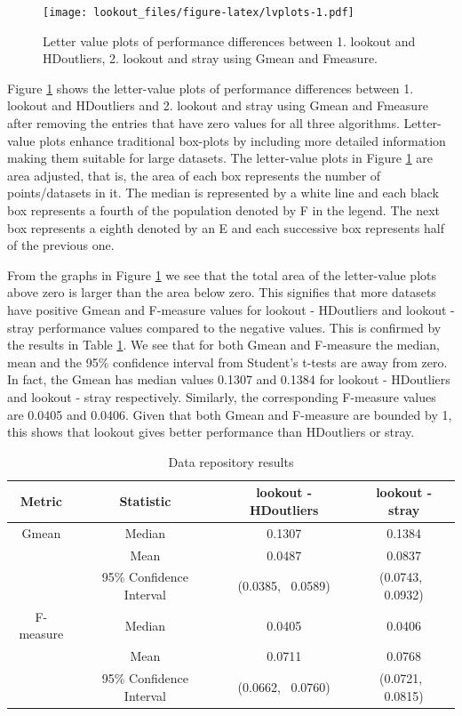 \documentclass[11pt,a4paper,]{article}
\theoremstyle{definition}
\theoremstyle{definition}
\theoremstyle{definition}
\theoremstyle{remark}
\begin{document}
\begin{figure}
\centering
\texttt{[image: lookout\_files/figure-latex/lvplots-1.pdf]}
\caption{\label{fig:lvplots}Letter value plots of performance differences between 1. lookout and HDoutliers, 2. lookout and stray using Gmean and Fmeasure.}
\end{figure}

Figure \ref{fig:lvplots} shows the letter-value plots \autocite{lvplots} of performance differences between
1. lookout and HDoutliers and
2. lookout and stray
using Gmean and Fmeasure after removing the entries that have zero values for all three algorithms. Letter-value plots enhance traditional box-plots by including more detailed information making them suitable for large datasets. The letter-value plots in Figure \ref{fig:lvplots} are area adjusted, that is, the area of each box represents the number of points/datasets in it. The median is represented by a white line and each black box represents a fourth of the population denoted by F in the legend. The next box represents a eighth denoted by an E and each successive box represents half of the previous one.

From the graphs in Figure \ref{fig:lvplots} we see that the total area of the letter-value plots above zero is larger than the area below zero. This signifies that more datasets have positive Gmean and F-measure values for lookout - HDoutliers and lookout - stray performance values compared to the negative values. This is confirmed by the results in Table \ref{tab:dataRepository}. We see that for both Gmean and F-measure the median, mean and the 95\% confidence interval from Student's t-tests are away from zero. In fact, the Gmean has median values 0.1307 and 0.1384 for lookout - HDoutliers and lookout - stray respectively. Similarly, the corresponding F-measure values are 0.0405 and 0.0406. Given that both Gmean and F-measure are bounded by 1, this shows that lookout gives better performance than HDoutliers or stray.

\begin{table}[!t]
    \centering
    \caption{Data repository results}
    \footnotesize
    \begin{tabular}{cccc}
        \toprule
    Metric & Statistic & lookout - HDoutliers & lookout - stray \\ \midrule
           Gmean    & Median                    & 0.1307    & 0.1384 \\
                    & Mean                      & 0.0487    & 0.0837 \\
                    & 95\% Confidence Interval & (0.0385, \, 0.0589) &  (0.0743, \, 0.0932) \\
                   \midrule 
        F-measure   & Median                   & 0.0405     & 0.0406  \\  
                    & Mean                     & 0.0711     & 0.0768  \\     
                    & 95\% Confidence Interval & (0.0662, \,  0.0760) &  (0.0721, \,  0.0815)\\
           \bottomrule
    \end{tabular}
    \label{tab:dataRepository}
\end{table}
\end{document}
